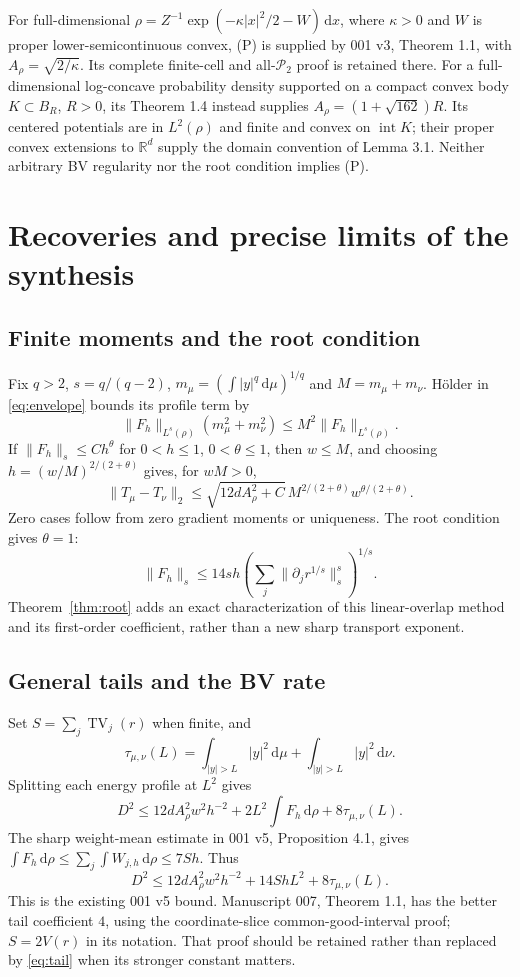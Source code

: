 \documentclass[11pt]{article}
\theoremstyle{remark}\newtheorem{remark}[theorem]{Remark}
\newcommand{\R}{\mathbb R}
\newcommand{\dd}{\,\mathrm d}
\newcommand{\norm}[1]{\lVert#1\rVert}
\newcommand{\Ptwo}{\mathcal P_2}
\begin{document}
For full-dimensional $\rho=Z^{-1}\exp(-\kappa|x|^2/2-W)\dd x$, where $\kappa>0$ and $W$ is proper lower-semicontinuous convex, (P) is supplied by 001 v3, Theorem 1.1, with $A_\rho=\sqrt{2/\kappa}$. Its complete finite-cell and all-$\Ptwo$ proof is retained there. For a full-dimensional log-concave probability density supported on a compact convex body $K\subset B_R$, $R>0$, its Theorem 1.4 instead supplies $A_\rho=(1+\sqrt{162})R$. Its centered potentials are in $L^2(\rho)$ and finite and convex on $\operatorname{int}K$; their proper convex extensions to $\R^d$ supply the domain convention of Lemma 3.1. Neither arbitrary BV regularity nor the root condition implies (P).

\section{Recoveries and precise limits of the synthesis}
\subsection{Finite moments and the root condition}
Fix $q>2$, $s=q/(q-2)$, $m_\mu=(\int|y|^q\dd\mu)^{1/q}$ and $M=m_\mu+m_\nu$. H\"older in \eqref{eq:envelope} bounds its profile term by
\[
 \norm{F_h}_{L^s(\rho)}(m_\mu^2+m_\nu^2)
 \le M^2\norm{F_h}_{L^s(\rho)}.
\]
If $\norm{F_h}_s\le C h^\theta$ for $0<h\le1$, $0<\theta\le1$, then $w\le M$, and choosing $h=(w/M)^{2/(2+\theta)}$ gives, for $wM>0$,
\[
 \norm{T_\mu-T_\nu}_2\le
 \sqrt{12dA_\rho^2+C}\,M^{2/(2+\theta)}w^{\theta/(2+\theta)}.
\]
Zero cases follow from zero gradient moments or uniqueness. The root condition gives $\theta=1$:
\[
 \norm{F_h}_s\le
 14s h\left(\sum_j\norm{\partial_jr^{1/s}}_s^s\right)^{1/s}.
\]
Theorem~\ref{thm:root} adds an exact characterization of this linear-overlap method and its first-order coefficient, rather than a new sharp transport exponent.

\subsection{General tails and the BV rate}
Set $S=\sum_j\operatorname{TV}_j(r)$ when finite, and
\[
 \tau_{\mu,\nu}(L)=\int_{|y|>L}|y|^2\dd\mu+
                         \int_{|y|>L}|y|^2\dd\nu.
\]
Splitting each energy profile at $L^2$ gives
\[
 D^2\le12dA_\rho^2w^2h^{-2}+2L^2\int F_h\dd\rho+8\tau_{\mu,\nu}(L).
\]
The sharp weight-mean estimate in 001 v5, Proposition 4.1, gives
$\int F_h\dd\rho\le\sum_j\int W_{j,h}\dd\rho\le7Sh$.
Thus
\begin{equation}\label{eq:tail}
 D^2\le12dA_\rho^2w^2h^{-2}+14ShL^2+8\tau_{\mu,\nu}(L).
\end{equation}
This is the existing 001 v5 bound. Manuscript 007, Theorem 1.1, has the better tail coefficient $4$, using the coordinate-slice common-good-interval proof; $S=2V(r)$ in its notation. That proof should be retained rather than replaced by \eqref{eq:tail} when its stronger constant matters.
\end{document}
